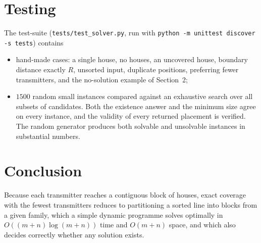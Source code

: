 \documentclass[11pt,a4paper]{article}
\theoremstyle{definition}
\begin{document}
\section{Testing}

The test-suite (\texttt{tests/test\_solver.py}, run with \texttt{python -m unittest discover -s tests}) contains
\begin{itemize}[nosep]
  \item hand-made cases: a single house, no houses, an uncovered house, boundary distance exactly $R$, unsorted input, duplicate positions, preferring fewer transmitters, and the no-solution example of Section~2;
  \item $1500$ random small instances compared against an exhaustive search over all subsets of candidates. Both the existence answer and the minimum size agree on every instance, and the validity of every returned placement is verified. The random generator produces both solvable and unsolvable instances in substantial numbers.
\end{itemize}

\section{Conclusion}

Because each transmitter reaches a contiguous block of houses, exact coverage with the fewest transmitters reduces to partitioning a sorted line into blocks from a given family, which a simple dynamic programme solves optimally in $O((m+n)\log(m+n))$ time and $O(m+n)$ space, and which also decides correctly whether any solution exists.
\end{document}
